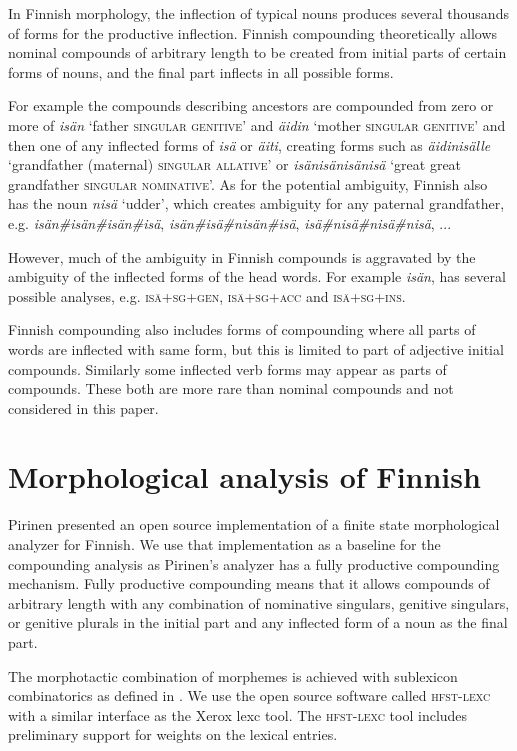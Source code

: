 \documentclass[11pt]{article}
\begin{document}
In Finnish morphology, the inflection of typical nouns produces
several thousands of forms for the productive inflection. Finnish
compounding theoretically allows nominal compounds of arbitrary length
to be created from initial parts of certain forms of nouns, and the
final part inflects in all possible forms.

For example the compounds describing ancestors are compounded from
zero or more of \emph{isän} `father \textsc{singular genitive}' and
\emph{äidin} `mother \textsc{singular genitive}' and then one of any
inflected forms of \emph{isä} or \emph{äiti}, creating forms such as
\emph{äidinisälle} `grandfather (maternal) \textsc{singular allative}'
or \emph{isänisänisänisä} `great great grandfather \textsc{singular
  nominative}'.  As for the potential ambiguity, Finnish also has the
noun \emph{nisä} `udder', which creates ambiguity for any paternal
grandfather, e.g. \emph{isän\#isän\#isän\#isä},
\emph{isän\#isä\#nisän\#isä}, \emph{isä\#nisä\#nisä\#nisä}, ...

However, much of the ambiguity in Finnish compounds is aggravated by
the ambiguity of the inflected forms of the head words. For example
\emph{isän}, has several possible analyses,
e.g. \textsc{isä+sg+gen}, \textsc{isä+sg+acc} and \textsc{isä+sg+ins}.

Finnish compounding also includes forms of compounding where all parts of
words are inflected with same form, but this is limited to part of adjective
initial compounds. Similarly some inflected verb forms may appear as parts
of compounds. These both are more rare than nominal compounds \cite{visk}
and not considered in this paper.

\section{Morphological analysis of Finnish}
\label{Sect2}

Pirinen  presented an open source
implementation of a finite state morphological analyzer for Finnish.
We use that implementation as a baseline for the compounding analysis
as Pirinen's analyzer has a fully productive compounding
mechanism. Fully productive compounding means that it allows compounds
of arbitrary length with any combination of nominative singulars,
genitive singulars, or genitive plurals in the initial part and any
inflected form of a noun as the final part.

The morphotactic combination of morphemes is achieved with sublexicon
combinatorics as defined in \cite{beesley/2003}. We use the open source
software called \textsc{hfst-lexc} with a similar interface as the
Xerox lexc tool. The \textsc{hfst-lexc} tool includes preliminary
support for weights on the lexical entries.
\end{document}
